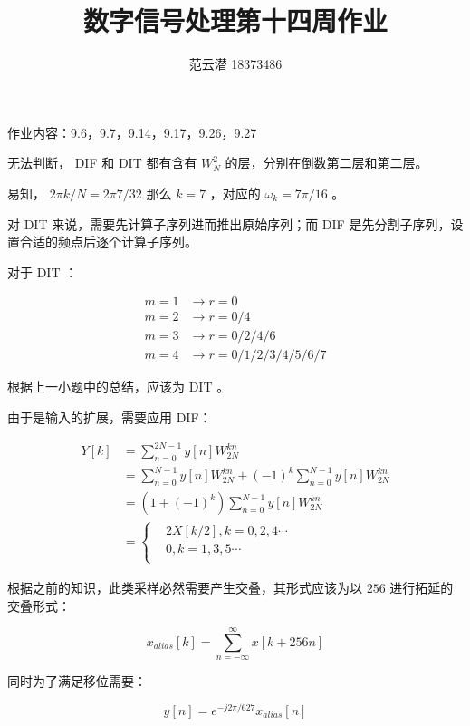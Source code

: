 \documentclass[lang=cn,11pt,a4paper,cite=authoryear,twocolumn]{elegantpaper}
\title{数字信号处理\quad 第十四周作业}
\author{范云潜 18373486}
\institute{微电子学院 184111 班}
\date{\zhtoday}
\begin{document}
\maketitle

作业内容：9.6，9.7，9.14，9.17，9.26，9.27




无法判断， DIF 和 DIT 都有含有 \(W_N^2\) 的层，分别在倒数第二层和第二层。


易知， \(2 \pi k / N = 2 \pi 7 / 32\) 那么 \(k = 7\) ，对应的 \(\omega_k = 7\pi / 16\) 。


对 DIT 来说，需要先计算子序列进而推出原始序列；而 DIF 是先分割子序列，设置合适的频点后逐个计算子序列。

对于 DIT ：

\[
\begin{aligned}
    m = 1 &\rightarrow r = 0\\
    m = 2 &\rightarrow r = 0/4\\
    m = 3 &\rightarrow r = 0/2/4/6\\
    m = 4 &\rightarrow r = 0/1/2/3/4/5/6/7
\end{aligned}
\]


根据上一小题中的总结，应该为 DIT 。


由于是输入的扩展，需要应用 DIF：

\[\begin{aligned}
    Y[k] &= \sum_{n = 0}^{2N-1} y[n] W_{2N}^{k n}\\
    &= \sum_{n=0}^{N-1}y[n] W_{2N}^{k n} + (-1)^k \sum_{n=0}^{N-1}y[n] W_{2N}^{k n} \\
    &= (1+(-1)^k)\sum_{n=0}^{N-1}y[n] W_{2N}^{k n} \\
    &= \left\{
        \begin{aligned}
            & 2 X[k/2] , k = 0, 2, 4 \cdots\\
            & 0, k = 1, 3, 5 \cdots \\
        \end{aligned}    
    \right.
\end{aligned}\]


根据之前的知识，此类采样必然需要产生交叠，其形式应该为以 \(256\) 进行拓延的交叠形式：

\[x_{alias}[k] = \sum_{n=-\infty}^{\infty} x[k + 256 n]\]

同时为了满足移位需要：

\[y[n] = e^{-j 2 \pi / 627} x_{alias}[n]\]

\end{document}
